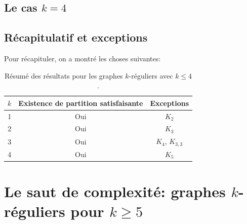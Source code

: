 

\subsection{Le cas \(k = 4\)}\label{subsec:k4}
%
%



\subsection{Récapitulatif et exceptions}\label{subsec:exceptions}

Pour récapituler, on a montré les choses suivantes:
\begin{table}[h]
    \centering
    \begin{tabular}{c|c|c} %
        \(k\) & Existence de partition satisfaisante & Exceptions \\
        \hline %
        1   & Oui                               & \(K_2\) \\
        2   & Oui                               & \(K_3\) \\
        3   & Oui                               & \(K_4\), \(K_{3,3}\) \\
        4   & Oui                               & \(K_5\)
    \end{tabular}
    \caption{Résumé des résultats pour les graphes \(k\)-réguliers avec \(k \leq 4\).}
\end{table}


\section{Le saut de complexité: graphes \(k\)-réguliers pour \(k \geq 5\)}\label{sec:k5}
%
%

